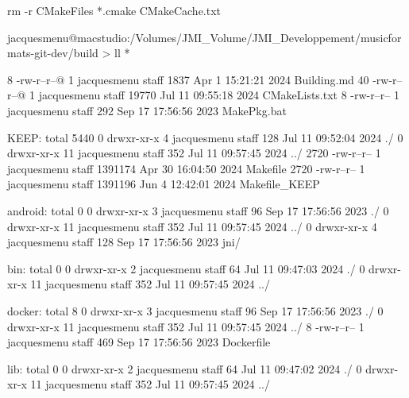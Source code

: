 rm -r CMakeFiles *.cmake CMakeCache.txt





jacquesmenu@macstudio:/Volumes/JMI_Volume/JMI_Developpement/musicformats-git-dev/build > ll *

 8 -rw-r--r--@ 1 jacquesmenu  staff   1837 Apr  1 15:21:21 2024 Building.md
40 -rw-r--r--@ 1 jacquesmenu  staff  19770 Jul 11 09:55:18 2024 CMakeLists.txt
 8 -rw-r--r--  1 jacquesmenu  staff    292 Sep 17 17:56:56 2023 MakePkg.bat

KEEP:
total 5440
   0 drwxr-xr-x   4 jacquesmenu  staff      128 Jul 11 09:52:04 2024 ./
   0 drwxr-xr-x  11 jacquesmenu  staff      352 Jul 11 09:57:45 2024 ../
2720 -rw-r--r--   1 jacquesmenu  staff  1391174 Apr 30 16:04:50 2024 Makefile
2720 -rw-r--r--   1 jacquesmenu  staff  1391196 Jun  4 12:42:01 2024 Makefile_KEEP

android:
total 0
0 drwxr-xr-x   3 jacquesmenu  staff   96 Sep 17 17:56:56 2023 ./
0 drwxr-xr-x  11 jacquesmenu  staff  352 Jul 11 09:57:45 2024 ../
0 drwxr-xr-x   4 jacquesmenu  staff  128 Sep 17 17:56:56 2023 jni/

bin:
total 0
0 drwxr-xr-x   2 jacquesmenu  staff   64 Jul 11 09:47:03 2024 ./
0 drwxr-xr-x  11 jacquesmenu  staff  352 Jul 11 09:57:45 2024 ../

docker:
total 8
0 drwxr-xr-x   3 jacquesmenu  staff   96 Sep 17 17:56:56 2023 ./
0 drwxr-xr-x  11 jacquesmenu  staff  352 Jul 11 09:57:45 2024 ../
8 -rw-r--r--   1 jacquesmenu  staff  469 Sep 17 17:56:56 2023 Dockerfile

lib:
total 0
0 drwxr-xr-x   2 jacquesmenu  staff   64 Jul 11 09:47:02 2024 ./
0 drwxr-xr-x  11 jacquesmenu  staff  352 Jul 11 09:57:45 2024 ../







